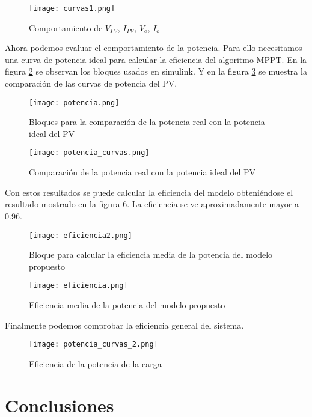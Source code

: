\documentclass[10pt,twocolumn]{article}
\begin{document}
 \begin{figure}[h!]
	\centering
	\texttt{[image: curvas1.png]}
	\caption{Comportamiento de $V_{PV}$, $I_{PV}$, $V_o$, $I_o$}
	\label{curvas1}
\end{figure}

Ahora podemos evaluar el comportamiento de la potencia. Para ello necesitamos una curva de potencia ideal para calcular la eficiencia del algoritmo MPPT. En la figura \ref{potencia} se observan los bloques usados en simulink. Y en la figura \ref{potencia_curvas} se muestra la comparación de las curvas de potencia del PV.

\begin{figure}[h!]
	\centering
	\texttt{[image: potencia.png]}
	\caption{Bloques para la comparación de la potencia real con la potencia ideal del PV}
	\label{potencia}
\end{figure}

\begin{figure}[h!]
	\centering
	\texttt{[image: potencia\_curvas.png]}
	\caption{Comparación de la potencia real con la potencia ideal del PV}
	\label{potencia_curvas}
\end{figure}

Con estos resultados se puede calcular la eficiencia del modelo obteniéndose el resultado mostrado en la figura \ref{eficiencia}. La eficiencia se ve aproximadamente mayor a 0.96.

\begin{figure}[h!]
	\centering
	\texttt{[image: eficiencia2.png]}
	\caption{Bloque para calcular la eficiencia media de la potencia del modelo propuesto}
	\label{eficiencia}
\end{figure}

\begin{figure}[h!]
	\centering
	\texttt{[image: eficiencia.png]}
	\caption{Eficiencia media de la potencia del modelo propuesto}
	\label{eficiencia}
\end{figure}

Finalmente podemos comprobar la eficiencia general del sistema.

\begin{figure}[h!]
	\centering
	\texttt{[image: potencia\_curvas\_2.png]}
	\caption{Eficiencia de la potencia de la carga}
	\label{eficiencia}
\end{figure}

\newpage
\section{Conclusiones}
\end{document}
